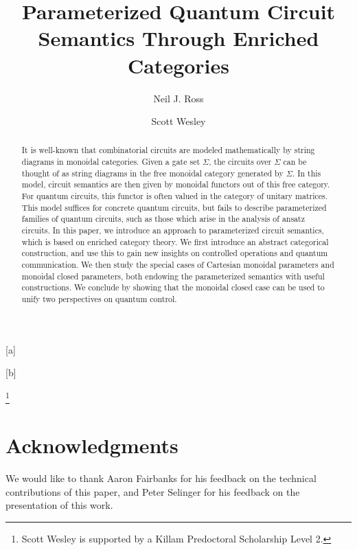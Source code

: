\documentclass{lmcs}
\begin{document}
\title{Parameterized Quantum Circuit Semantics Through Enriched Categories}

\author{Neil J. Ross}[a]
\address{Dalhousie University, Halifax, NS, Canada}

\author{Scott Wesley}[b]
\address{Dalhousie University, Halifax, NS, Canada}

\thanks{Scott Wesley is supported by a Killam Predoctoral Scholarship Level 2.}

\begin{abstract}
    It is well-known that combinatorial circuits are modeled mathematically by string diagrams in monoidal categories.
    Given a gate set $\Sigma$, the circuits over $\Sigma$ can be thought of as string diagrams in the free monoidal category generated by $\Sigma$.
    In this model, circuit semantics are then given by monoidal functors out of this free category.
    For quantum circuits, this functor is often valued in the category of unitary matrices.
    This model suffices for concrete quantum circuits, but fails to describe parameterized families of quantum circuits, such as those which arise in the analysis of ansatz circuits.
    In this paper, we introduce an approach to parameterized circuit semantics, which is based on enriched category theory.
    We first introduce an abstract categorical construction, and use this to gain new insights on controlled operations and quantum communication.
    We then study the special cases of Cartesian monoidal parameters and monoidal closed parameters, both endowing the parameterized semantics with useful constructions.
    We conclude by showing that the monoidal closed case can be used to unify two perspectives on quantum control.
\end{abstract}

\maketitle









\section*{Acknowledgments}

We would like to thank Aaron Fairbanks for his feedback on the technical contributions of this paper, and Peter Selinger for his feedback on the presentation of this work.



\end{document}
